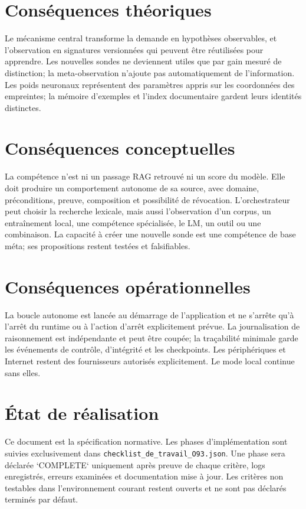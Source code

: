 \documentclass[11pt,a4paper,oneside]{report}
\begin{document}
\section{Conséquences théoriques}
Le mécanisme central transforme la demande en hypothèses observables, et l'observation en signatures versionnées qui peuvent être réutilisées pour apprendre. Les nouvelles sondes ne deviennent utiles que par gain mesuré de distinction; la meta-observation n'ajoute pas automatiquement de l'information. Les poids neuronaux représentent des paramètres appris sur les coordonnées des empreintes; la mémoire d'exemples et l'index documentaire gardent leurs identités distinctes.

\section{Conséquences conceptuelles}
La compétence n'est ni un passage RAG retrouvé ni un score du modèle. Elle doit produire un comportement autonome de sa source, avec domaine, préconditions, preuve, composition et possibilité de révocation. L'orchestrateur peut choisir la recherche lexicale, mais aussi l'observation d'un corpus, un entraînement local, une compétence spécialisée, le LM, un outil ou une combinaison. La capacité à créer une nouvelle sonde est une compétence de base méta; ses propositions restent testées et falsifiables.

\section{Conséquences opérationnelles}
La boucle autonome est lancée au démarrage de l'application et ne s'arrête qu'à l'arrêt du runtime ou à l'action d'arrêt explicitement prévue. La journalisation de raisonnement est indépendante et peut être coupée; la traçabilité minimale garde les événements de contrôle, d'intégrité et les checkpoints. Les périphériques et Internet restent des fournisseurs autorisés explicitement. Le mode local continue sans elles.

\section{État de réalisation}
Ce document est la spécification normative. Les phases d'implémentation sont suivies exclusivement dans \texttt{checklist\_de\_travail\_O93.json}. Une phase sera déclarée `COMPLETE` uniquement après preuve de chaque critère, logs enregistrés, erreurs examinées et documentation mise à jour. Les critères non testables dans l'environnement courant restent ouverts et ne sont pas déclarés terminés par défaut.
\end{document}

